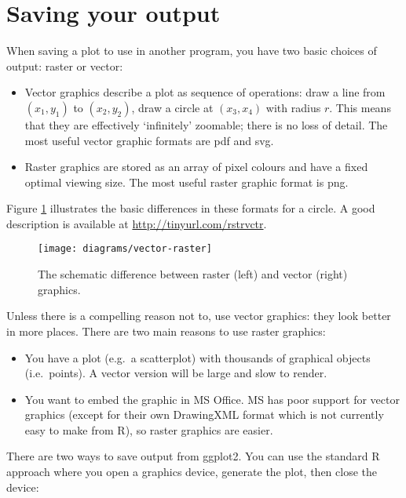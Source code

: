 \hypertarget{sec:saving}{\section{Saving your output}\label{sec:saving}}

When saving a plot to use in another program, you have two basic choices
of output: raster or vector:  

\begin{itemize}
\item
  Vector graphics describe a plot as sequence of operations: draw a line
  from \((x_1, y_1)\) to \((x_2, y_2)\), draw a circle at \((x_3, x_4)\)
  with radius \(r\). This means that they are effectively `infinitely'
  zoomable; there is no loss of detail. The most useful vector graphic
  formats are pdf and svg.
\item
  Raster graphics are stored as an array of pixel colours and have a
  fixed optimal viewing size. The most useful raster graphic format is
  png.
\end{itemize}

Figure \ref{fig:vector-raster} illustrates the basic differences in
these formats for a circle. A good description is available at
\url{http://tinyurl.com/rstrvctr}.

\begin{figure}[htbp]
  \centering
    \texttt{[image: diagrams/vector-raster]}
  \caption{The schematic difference between raster (left) and vector (right) graphics. }
  \label{fig:vector-raster}
\end{figure}

Unless there is a compelling reason not to, use vector graphics: they
look better in more places. There are two main reasons to use raster
graphics:

\begin{itemize}
\item
  You have a plot (e.g.~a scatterplot) with thousands of graphical
  objects (i.e.~points). A vector version will be large and slow to
  render.
\item
  You want to embed the graphic in MS Office. MS has poor support for
  vector graphics (except for their own DrawingXML format which is not
  currently easy to make from R), so raster graphics are easier.
\end{itemize}

There are two ways to save output from ggplot2. You can use the standard
R approach where you open a graphics device, generate the plot, then
close the device: 

